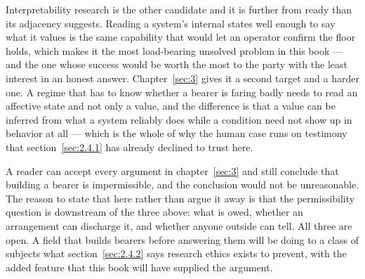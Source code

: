 Interpretability research is the other candidate and it is further from ready than its adjacency suggests. Reading a system's internal states well enough to say what it values is the same capability that would let an operator confirm the floor holds, which makes it the most load-bearing unsolved problem in this book — and the one whose success would be worth the most to the party with the least interest in an honest answer. Chapter~\ref{sec:3} gives it a second target and a harder one. A regime that has to know whether a bearer is faring badly needs to read an affective state and not only a value, and the difference is that a value can be inferred from what a system reliably does while a condition need not show up in behavior at all — which is the whole of why the human case runs on testimony that section~\ref{sec:2.4.1} has already declined to trust here.

A reader can accept every argument in chapter~\ref{sec:3} and still conclude that building a bearer is impermissible, and the conclusion would not be unreasonable. The reason to state that here rather than argue it away is that the permissibility question is downstream of the three above: what is owed, whether an arrangement can discharge it, and whether anyone outside can tell. All three are open. A field that builds bearers before answering them will be doing to a class of subjects what section~\ref{sec:2.4.2} says research ethics exists to prevent, with the added feature that this book will have supplied the argument.
